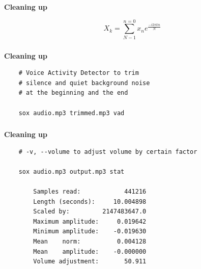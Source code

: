 \documentclass[usenames,dvipsnames, 18pt, compress, aspectratio=169]{beamer}
\begin{document}
\begin{frame}[fragile]{}
    \frametitle{}
    \begin{center}
        \textbf{Cleaning up}
        \vspace{0.2cm}

        \huge
        \begin{equation*}
        X_k = \sum_{N-1}^{n=0} x_n e^{\frac{-i 2\pi kn}{N}}
        \end{equation*}

    \end{center}
\end{frame}

\begin{frame}[fragile]{}
    \frametitle{}
    \begin{center}
        \textbf{Cleaning up}
        \vspace{0.2cm}

        \begin{verbatim}
    # Voice Activity Detector to trim
    # silence and quiet background noise
    # at the beginning and the end

    sox audio.mp3 trimmed.mp3 vad

        \end{verbatim}

    \end{center}
\end{frame}

\begin{frame}[fragile]{}
    \frametitle{}
    \begin{center}
        \textbf{Cleaning up}
        \vspace{0.2cm}

        \begin{verbatim}
    # -v, --volume to adjust volume by certain factor

    sox audio.mp3 output.mp3 stat

        Samples read:            441216
        Length (seconds):     10.004898
        Scaled by:         2147483647.0
        Maximum amplitude:     0.019642
        Minimum amplitude:    -0.019630
        Mean    norm:          0.004128
        Mean    amplitude:    -0.000000
        Volume adjustment:       50.911
        \end{verbatim}

    \end{center}
\end{frame}
\end{document}
